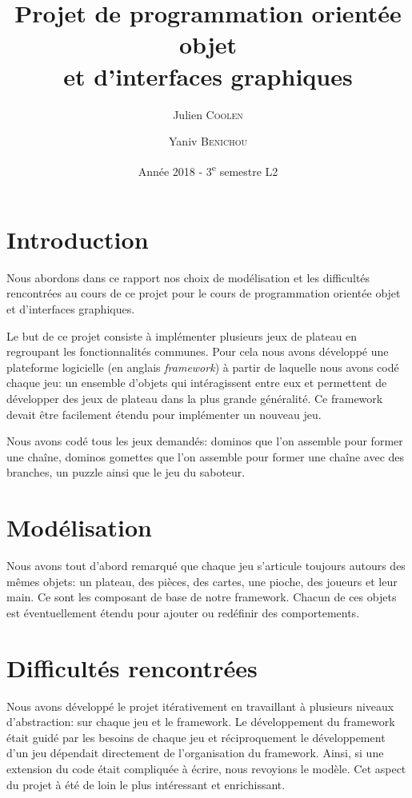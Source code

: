 \documentclass[a4paper, 11pt, DIV=9]{scrartcl}
\title{Projet de programmation orientée objet \\ et d'interfaces graphiques}
\author{Julien \textsc{Coolen} \and Yaniv \textsc{Benichou}}
\date{Année 2018 - 3\textsuperscript{e} semestre L2}
\begin{document}
\maketitle

\section{Introduction}

Nous abordons dans ce rapport nos choix de modélisation et
les difficultés rencontrées au cours de ce projet pour le cours de
programmation orientée objet et d’interfaces graphiques.

Le but de ce projet consiste à implémenter plusieurs jeux de
plateau en regroupant les fonctionnalités communes. Pour cela
nous avons développé une plateforme logicielle (en anglais \textit{framework}) à partir
de laquelle nous avons codé chaque jeu: un ensemble d'objets qui intéragissent
entre eux et permettent de développer des jeux de plateau dans la plus grande
généralité. Ce framework devait être facilement étendu pour implémenter un
nouveau jeu.

Nous avons codé tous les jeux demandés: dominos que l'on assemble pour former
une chaîne, dominos gomettes que l'on assemble pour former une chaîne avec des
branches, un puzzle ainsi que le jeu du saboteur.


\section{Modélisation}

Nous avons tout d'abord remarqué que chaque jeu s'articule toujours autours des mêmes objets:
un plateau, des pièces, des cartes, une pioche, des joueurs et leur main.
Ce sont les composant de base de notre framework. Chacun de ces objets est
éventuellement étendu pour ajouter ou redéfinir des comportements.


\section{Difficultés rencontrées}

Nous avons développé le projet itérativement en travaillant à plusieurs niveaux
d'abstraction: sur chaque jeu et le framework. Le développement du framework
était guidé par les besoins de chaque jeu et réciproquement le développement
d'un jeu dépendait directement de l'organisation du framework. Ainsi, si une
extension du code était compliquée à écrire, nous revoyions le modèle. 
Cet aspect du projet à été de loin le plus intéressant et enrichissant.
\end{document}
